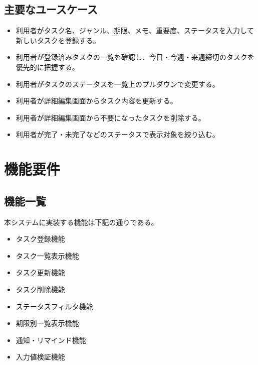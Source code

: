 \documentclass[dvipdfmx,10pt]{jarticle}
\begin{document}
    \subsection{主要なユースケース}
    \begin{itemize}
        \item 利用者がタスク名、ジャンル、期限、メモ、重要度、ステータスを入力して新しいタスクを登録する。
        \item 利用者が登録済みタスクの一覧を確認し、今日・今週・来週締切のタスクを優先的に把握する。
        \item 利用者がタスクのステータスを一覧上のプルダウンで変更する。
        \item 利用者が詳細編集画面からタスク内容を更新する。
        \item 利用者が詳細編集画面から不要になったタスクを削除する。
        \item 利用者が完了・未完了などのステータスで表示対象を絞り込む。
    \end{itemize}

    \pagebreak

    \section{機能要件}
    \label{sec:functional}
    \subsection{機能一覧}
    本システムに実装する機能は下記の通りである。
    \begin{itemize}
        \item タスク登録機能
        \item タスク一覧表示機能
        \item タスク更新機能
        \item タスク削除機能
        \item ステータスフィルタ機能
        \item 期限別一覧表示機能
        \item 通知・リマインド機能
        \item 入力値検証機能
    \end{itemize}
\end{document}
